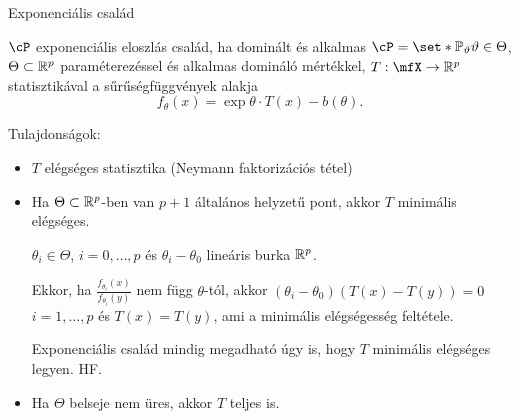 \documentclass[aspectratio=169,notheorems,9pt,\option]{beamer}
\begin{document}
\begin{frame}{Exponenciális család}
  \begin{df}
    $\cP$ exponenciális eloszlás család, ha dominált és alkalmas 
    $\cP=\set*{\P[\theta]}{\theta\in\Theta}$, $\Theta\subset\mathbb{R}^p$ paraméterezéssel 
    és alkalmas domináló mértékkel, $T:\mfX\to\real^p$ statisztikával 
    a sűrűségfüggvények alakja 
    \begin{displaymath}
      f_{\theta} (x) =\exp{\theta\cdot T(x)-b (\theta)}.\tag{*}
    \end{displaymath}
  \end{df}
  \continue
  Tulajdonságok:
  \begin{itemize}
  \item $T$ elégséges statisztika (Neymann faktorizációs tétel)
  \item 
  Ha $\Theta\subset\mathbb{R}^p$-ben van $p+1$ általános helyzetű pont, akkor $T$ minimális elégséges.

  $\theta_i\in\Theta$, $i=0,\dots,p$ és $\theta_i-\theta_0$ lineáris burka $\mathbb{R}^p$.  
  
  Ekkor, ha $\frac{f_{\theta_i}(x)}{f_{\theta_i}(y)}$ nem függ $\theta$-tól, akkor $(\theta_i-\theta_0)(T(x)-T(y))=0$ 
  $i=1,\dots,p$ és $T(x)=T(y)$, ami a minimális elégségesség feltétele.

  Exponenciális család mindig megadható úgy is, hogy $T$ minimális elégséges legyen. HF.
  

  \item Ha $\Theta$ belseje nem üres, akkor $T$ teljes is.
  
  \end{itemize}
\end{frame}
\end{document}
